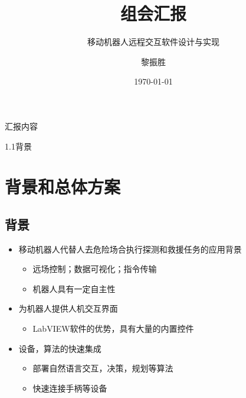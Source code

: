 \documentclass{beamer}
\title{组会汇报}
\subtitle{移动机器人远程交互软件设计与实现}
\institute{C400}
\author{黎振胜}
\date{\today}
\begin{document}
\begin{frame}
\maketitle
\end{frame}
\begin{frame}[t]{汇报内容}
    \tableofcontents
\end{frame}
\begin{frame}[t]{1.1背景}
    \section{背景和总体方案}
    \subsection{背景}
    \begin{itemize}
        \item 移动机器人代替人去危险场合执行探测和救援任务的应用背景
            \begin{itemize}
                \item 远场控制；数据可视化；指令传输
                \item 机器人具有一定自主性
            \end{itemize}
        \item 为机器人提供人机交互界面
            \begin{itemize}
                \item LabVIEW软件的优势，具有大量的内置控件
            \end{itemize}
        \item 设备，算法的快速集成
            \begin{itemize}
                \item 部署自然语言交互，决策，规划等算法
                \item 快速连接手柄等设备
            \end{itemize}
    \end{itemize}
\end{frame}
\end{document}
